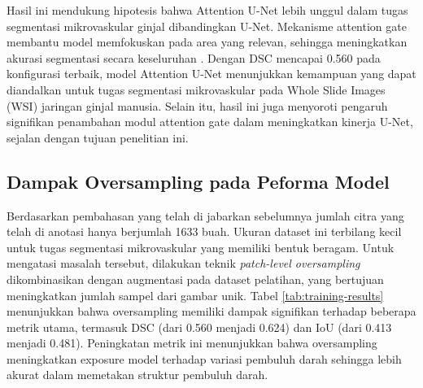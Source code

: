 \noindent Hasil ini mendukung hipotesis bahwa Attention U-Net lebih unggul dalam tugas segmentasi mikrovaskular ginjal dibandingkan U-Net. Mekanisme attention gate membantu model memfokuskan pada area yang relevan, sehingga meningkatkan akurasi segmentasi secara keseluruhan \cite{oktay_attention_2018}. Dengan DSC mencapai 0.560 pada konfigurasi terbaik, model Attention U-Net menunjukkan kemampuan yang dapat diandalkan untuk tugas segmentasi mikrovaskular pada Whole Slide Images (WSI) jaringan ginjal manusia. Selain itu, hasil ini juga menyoroti pengaruh signifikan penambahan modul attention gate dalam meningkatkan kinerja U-Net, sejalan dengan tujuan penelitian ini.


\subsection{Dampak Oversampling pada Peforma Model}


\noindent Berdasarkan pembahasan yang telah di jabarkan sebelumnya jumlah citra yang telah di anotasi hanya berjumlah 1633 buah. Ukuran dataset ini terbilang kecil untuk tugas segmentasi mikrovaskular yang memiliki bentuk beragam. Untuk mengatasi masalah tersebut, dilakukan teknik \textit{patch-level oversampling} dikombinasikan dengan augmentasi pada dataset pelatihan, yang bertujuan meningkatkan jumlah sampel dari gambar unik. Tabel \ref{tab:training-results} menunjukkan bahwa oversampling memiliki dampak signifikan terhadap beberapa metrik utama, termasuk DSC (dari 0.560 menjadi 0.624) dan IoU (dari 0.413 menjadi 0.481). Peningkatan metrik ini menunjukkan bahwa oversampling meningkatkan exposure model terhadap variasi pembuluh darah sehingga lebih akurat dalam memetakan struktur pembuluh darah. 



